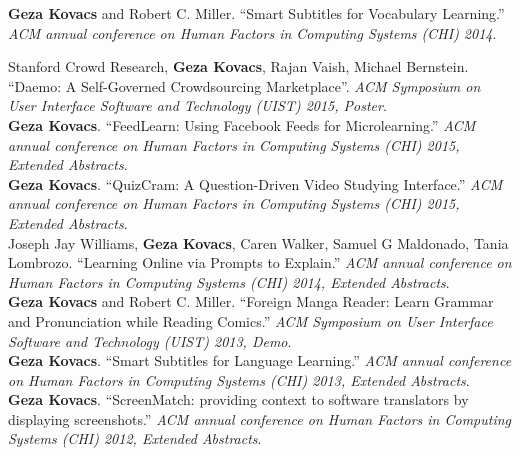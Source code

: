 \textbf{Geza Kovacs} and Robert C. Miller. ``Smart Subtitles for Vocabulary Learning.'' \emph{ACM annual conference on Human Factors in Computing Systems (CHI) 2014}.\\ %


Stanford Crowd Research, \textbf{Geza Kovacs}, Rajan Vaish, Michael Bernstein. ``Daemo: A Self-Governed Crowdsourcing Marketplace''. \emph{ACM Symposium on User Interface Software and Technology (UIST) 2015, Poster}.\\

\textbf{Geza Kovacs}. ``FeedLearn: Using Facebook Feeds for Microlearning.'' \emph{ACM annual conference on Human Factors in Computing Systems (CHI) 2015, Extended Abstracts}.\\ %

\textbf{Geza Kovacs}. ``QuizCram: A Question-Driven Video Studying Interface.'' \emph{ACM annual conference on Human Factors in Computing Systems (CHI) 2015, Extended Abstracts}.\\

Joseph Jay Williams, \textbf{Geza Kovacs}, Caren Walker, Samuel G Maldonado, Tania Lombrozo. ``Learning Online via Prompts to Explain.'' \emph{ACM annual conference on Human Factors in Computing Systems (CHI) 2014, Extended Abstracts}.\\

\textbf{Geza Kovacs} and Robert C. Miller. ``Foreign Manga Reader: Learn Grammar and Pronunciation while Reading Comics.'' \emph{ACM Symposium on User Interface Software and Technology (UIST) 2013, Demo}.\\

\textbf{Geza Kovacs}. ``Smart Subtitles for Language Learning.'' \emph{ACM annual conference on Human Factors in Computing Systems (CHI) 2013, Extended Abstracts}.\\ %

\textbf{Geza Kovacs}. ``ScreenMatch: providing context to software translators by displaying screenshots.'' \emph{ACM annual conference on Human Factors in Computing Systems (CHI) 2012, Extended Abstracts}.\\ %
